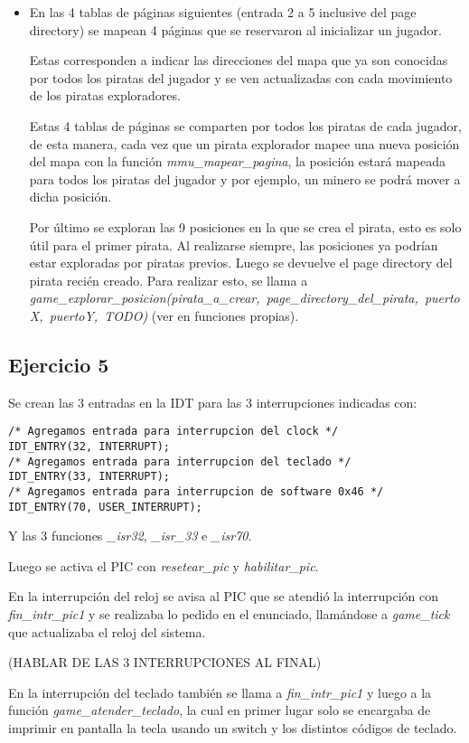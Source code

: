 \begin{itemize}
\item En las 4 tablas de páginas siguientes (entrada 2 a 5 inclusive del page
directory) se mapean 4 páginas que se reservaron al inicializar un jugador.

Estas corresponden a indicar las direcciones del mapa que ya son conocidas por
todos los piratas del jugador y se ven actualizadas con cada movimiento de los
piratas exploradores.

Estas 4 tablas de páginas se comparten por todos los piratas de cada jugador, de
esta manera, cada vez que un pirata explorador mapee una nueva posición del mapa
con la función {\it mmu_mapear_pagina\/}, la posición estará mapeada para todos
los piratas del jugador y por ejemplo, un minero se podrá mover a dicha posición.

Por último se exploran las 9 posiciones en la que se crea el pirata, esto es
solo útil para el primer pirata. Al realizarse siempre, las posiciones ya
podrían estar exploradas por piratas previos. Luego se devuelve el page
directory del pirata recién creado. Para realizar esto, se llama a
\hbox{\it game_explorar_posicion(pirata_a_crear, page_directory_del_pirata, puertoX, puertoY, TODO)}
(ver en funciones propias).
\end{itemize}

\subsection{Ejercicio 5}

Se crean las 3 entradas en la IDT para las 3 interrupciones indicadas con:
\begin{lstlisting}
/* Agregamos entrada para interrupcion del clock */
IDT_ENTRY(32, INTERRUPT);
/* Agregamos entrada para interrupcion del teclado */
IDT_ENTRY(33, INTERRUPT);
/* Agregamos entrada para interrupcion de software 0x46 */
IDT_ENTRY(70, USER_INTERRUPT);
\end{lstlisting}

Y las 3 funciones {\it _isr32\/}, {\it _isr_33\/} e {\it _isr70\/}.

Luego se activa el PIC con {\it resetear_pic\/} y {\it habilitar_pic\/}.

En la interrupción del reloj se avisa al PIC que se atendió la interrupción con
{\it fin_intr_pic1} y se realizaba lo pedido en el enunciado, llamándose a
{\it game_tick\/} que actualizaba el reloj del sistema.

(HABLAR DE LAS 3 INTERRUPCIONES AL FINAL)

En la interrupción del teclado también se llama a {\it fin_intr_pic1\/} y luego
a la función \hbox{\it game_atender_teclado\/}, la cual en primer lugar solo se
encargaba de imprimir en pantalla la tecla usando un switch y los distintos
códigos de teclado.


